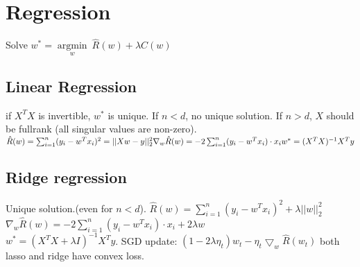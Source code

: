 \section*{Regression}

Solve $w^* = \underset{w}{\operatorname{argmin}} ~ \hat{R}(w)+ \lambda C(w)$

\subsection*{Linear Regression}
if $X^T X$ is invertible, $w^*$ is unique. If $n<d$, no unique solution. If $n>d$, $X$ should be fullrank (all singular values are non-zero).
$\hat{R}(w) = \sum_{i=1}^n (y_i - w^Tx_i)^2 = ||Xw-y||^2_2\\
\nabla_w \hat{R}(w) = -2 \sum_{i=1}^n (y_i-w^T x_i) \cdot x_i \\
w^* = (X^T X)^{-1} X^T y$


\subsection*{Ridge regression}
Unique solution.(even for $n<d$). 
$\hat{R}(w) = \sum_{i=1}^n (y_i - w^Tx_i)^2 + \lambda ||w||_2^2$\\
$\nabla_w \hat{R}(w) = -2 \sum_{i=1}^n (y_i-w^T x_i) \cdot x_i + 2 \lambda w$\\
$w^*=(X^T X + \lambda I)^{-1} X^T y$. SGD update: $(1 - 2\lambda \eta_t) w_t - \eta_t \bigtriangledown_w \hat{R}(w_t)  $
both lasso and ridge have convex loss. 